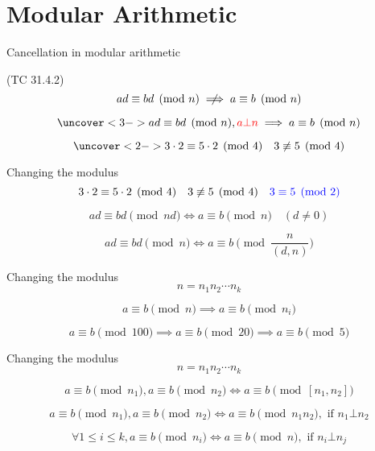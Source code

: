 \section{Modular Arithmetic}

\begin{frame}{Cancellation in modular arithmetic}
  \begin{exampleblock}{(TC 31.4.2)}
	\[
	  ad \equiv bd \pmod{n} \centernot\implies a \equiv b \pmod{n} 
	\]

	\[
	  \uncover<3->{ad \equiv bd \pmod{n}, \textcolor{red}{a \bot n} \implies a \equiv b \pmod{n}}
	\]
  \end{exampleblock}

  \[
	\uncover<2->{3 \cdot 2 \equiv 5 \cdot 2 \pmod{4} \quad 3 \not\equiv 5 \pmod{4}}
  \]
\end{frame}
\begin{frame}{Changing the modulus}
  \[
	3 \cdot 2 \equiv 5 \cdot 2 \pmod{4} \quad 3 \not\equiv 5 \pmod{4}
	\quad \textcolor{blue}{3 \equiv 5 \pmod{2}}
  \]

  \pause
  \[
	ad \equiv bd \pmod{nd} \iff a \equiv b \pmod{n} \quad (d \neq 0)
  \]

  \pause
  \[
	ad \equiv bd \pmod{n} \iff a \equiv b \pmod{\frac{n}{(d,n)}}
  \]
\end{frame}
\begin{frame}{Changing the modulus}
  \[
	n = n_1n_2\cdots n_k
  \]

  \pause
  \[
	a \equiv b \pmod{n} \implies a \equiv b \pmod{n_i}
  \]

  \pause
  \[
	a \equiv b \pmod{100} \implies a \equiv b \pmod{20} \implies a \equiv b \pmod{5}
  \]
\end{frame}
\begin{frame}{Changing the modulus}
  \[
	n = n_1n_2\cdots n_k
  \]

  \pause
  \[
	a \equiv b \pmod{n_1}, a \equiv b \pmod{n_2} \iff a \equiv b \pmod{[n_1, n_2]}
  \]

  \pause
  \[
	a \equiv b \pmod{n_1}, a \equiv b \pmod{n_2} \iff a \equiv b \pmod{n_1n_2}, \text{ if } n_1 \bot n_2
  \]

  \pause
  \[
	\forall 1 \le i \le k, a \equiv b \pmod{n_i} \iff a \equiv b \pmod{n}, \text{ if } n_i \bot n_j
  \]
\end{frame}
